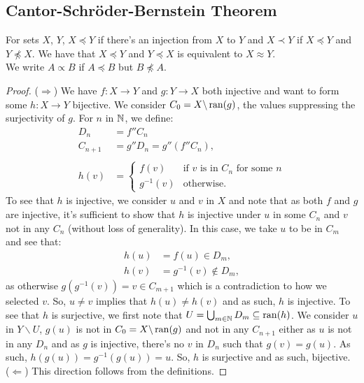 \subsection{Cantor-Schröder-Bernstein Theorem}

For sets $X$, $Y$, $X \preceq Y$ if there's an injection from $X$ to $Y$
and $X \prec Y$ if $X \preceq Y$ and $Y \npreceq X$.
We have that $X \preceq Y$ and $Y \preceq X$ is equivalent
to $X \approx Y$.
\\[\baselineskip]
We write $A \propto B$ if $A \preceq B$ but $B \npreceq A$.

\newpage

\begin{proof}
    ($\Rightarrow$) We have $f : X \to Y$ and $g : Y \to X$ both
    injective and want to form some $h : X \to Y$ bijective.
    We consider $C_0 = X \backslash \operatorname{ran}(g)$, the values suppressing
    the surjectivity of $g$. For $n$ in $\mathbb{N}$, we define: \begin{align*}
        D_{n}     &= f''C_n \\
        C_{n + 1} &= g''D_n = g''(f''C_n), \\
        \\
        h(v) &= \begin{cases}
            f(v) & \text{if $v$ is in $C_n$ for some $n$} \\
            g^{-1}(v) & \text{otherwise.}
        \end{cases}
    \end{align*} To see that $h$ is injective, we consider $u$ and $v$ in
    $X$ and note that as both $f$ and $g$ are injective, it's sufficient to
    show that $h$ is injective under $u$ in some $C_n$ and $v$ not in any
    $C_n$ (without loss of generality). In this case, we take $u$ to be in $C_m$ 
    and see that: \begin{align*}
        h(u) &= f(u) \in D_m, \\
        h(v) &= g^{-1}(v) \notin D_m,
    \end{align*} as otherwise $g(g^{-1}(v)) = v \in C_{m + 1}$ which is
    a contradiction to how we selected $v$. So, $u \neq v$ implies that
    $h(u) \neq h(v)$ and as such, $h$ is injective. To see that $h$ is
    surjective, we first note that $U = \bigcup_{m \in \mathbb{N}} D_m \subseteq \operatorname{ran}(h)$.
    We consider $u$ in $Y \backslash U$, $g(u)$ is not in $C_0 = X \backslash \operatorname{ran}(g)$
    and not in any $C_{n + 1}$ either as $u$ is not in any $D_n$ and as $g$ is
    injective, there's no $v$ in $D_n$ such that $g(v) = g(u)$. As such,
    $h(g(u)) = g^{-1}(g(u)) = u$. So, $h$ is surjective and as such, bijective.
    \\[\baselineskip]
    ($\Leftarrow$) This direction follows from the definitions.
\end{proof}

